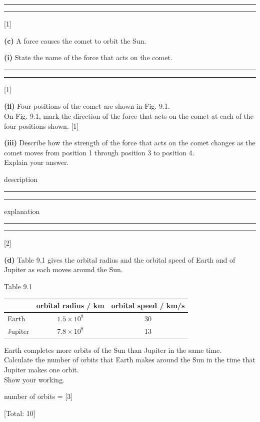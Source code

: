 \documentclass[11pt]{article}
\newcommand{\answerline}[1][3in]{\makebox[#1]{\hrulefill}}
\begin{document}
\vspace{1cm}
\hrule
\vspace{0.8cm}
\hrule
\hfill [1]

\vspace{0.5cm}
\textbf{(c)} \quad A force causes the comet to orbit the Sun.

\textbf{(i)} \quad State the name of the force that acts on the comet.

\vspace{1cm}
\hrule
\vspace{0.8cm}
\hrule
\hfill [1]

\vspace{0.5cm}
\textbf{(ii)} \quad Four positions of the comet are shown in Fig. 9.1.\\
On Fig. 9.1, mark the direction of the force that acts on the comet at each of the four positions shown. \hfill [1]

\newpage

\textbf{(iii)} \quad Describe how the strength of the force that acts on the comet changes as the comet moves from position 1 through position 3 to position 4.\\
Explain your answer.

\vspace{0.5cm}
description \vspace{0.5cm} \hrule \vspace{0.8cm} \hrule

\vspace{0.5cm}
explanation \vspace{0.5cm} \hrule \vspace{0.8cm} \hrule \hfill [2]

\vspace{0.5cm}
\textbf{(d)} \quad Table 9.1 gives the orbital radius and the orbital speed of Earth and of Jupiter as each moves around the Sun.

\begin{center}
Table 9.1\\[1ex]
\renewcommand{\arraystretch}{1.5}
\begin{tabular}{|l|c|c|}
\hline
& orbital radius / km & orbital speed / km/s \\
\hline
Earth & $1.5 \times 10^{8}$ & 30 \\
\hline
Jupiter & $7.8 \times 10^{8}$ & 13 \\
\hline
\end{tabular}
\end{center}

Earth completes more orbits of the Sun than Jupiter in the same time.\\
Calculate the number of orbits that Earth makes around the Sun in the time that Jupiter makes one orbit.\\
Show your working.

\vspace{3cm}
\hfill number of orbits = \answerline[2in] [3]

\vspace{0.5cm}
\hfill [Total: 10]
\newpage
\end{document}
